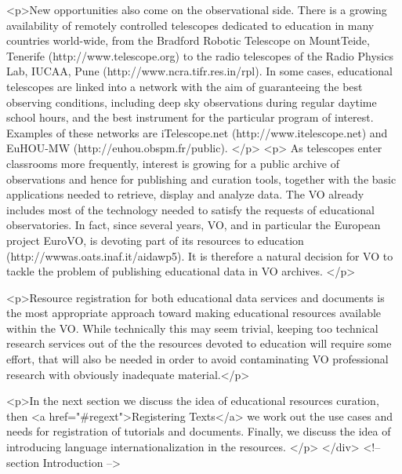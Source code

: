 <p>New opportunities also come on the observational side. 
There is a growing availability of remotely controlled 
telescopes dedicated to education in many countries world-wide, from the 
Bradford Robotic Telescope on MountTeide, Tenerife (http://www.telescope.org) 
to the radio telescopes of the Radio Physics Lab, IUCAA, Pune 
(http://www.ncra.tifr.res.in/rpl). In some cases, educational telescopes are 
linked into a network with the aim of guaranteeing the best observing conditions, 
including deep sky observations during regular daytime school hours, and 
the best instrument for the particular program of interest. Examples
of these networks are iTelescope.net (http://www.itelescope.net) and EuHOU-MW 
(http://euhou.obspm.fr/public).
</p>
<p>
As telescopes enter classrooms more frequently, interest is growing for a 
public archive of observations and hence for publishing and curation tools, 
together with the basic applications needed to retrieve, display
and analyze data. The VO already includes most of the technology needed 
to satisfy the requests of educational observatories. In fact, since several 
years, VO, and in particular the European project EuroVO, is devoting part 
of its resources to education (http://wwwas.oats.inaf.it/aidawp5). It is 
therefore a natural decision for VO to tackle the problem of publishing 
educational data in VO archives.
</p>

<p>Resource registration for both educational data services and documents 
is the most appropriate approach toward making educational resources 
available within the VO.  While
technically this may seem trivial, keeping too technical
research services out of the the resources devoted to education will
require some effort, that will also be needed in order to avoid contaminating 
VO professional research with obviously inadequate material.</p>

<p>In the next section we discuss the idea of educational resources curation, then 
<a href="#regext">Registering Texts</a> we work out the use cases and needs for
registration of tutorials and documents. Finally, we discuss the idea of introducing language
internationalization in the resources.
</p>
</div> <!-- section Introduction -->

